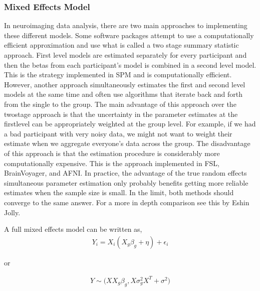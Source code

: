 \documentclass[letterpaper,10pt,english]{sphinxmanual}
\begin{document}
\subsubsection{Mixed Effects Model}
\label{\detokenize{content/Group_Analysis:mixed-effects-model}}
In neuroimaging data analysis, there are two main approaches to implementing these different models. Some software packages attempt to use a computationally efficient approximation and use what is called a two stage summary statistic approach. First level models are estimated separately for every participant and then the betas from each participant’s model is combined in a second level model. This is the strategy implemented in SPM and is computationally efficient. However, another approach simultaneously estimates the first and second level models at the same time and often use algorithms that iterate back and forth from the single to the group. The main advantage of this approach over the two\sphinxhyphen{}stage approach is that the uncertainty in the parameter estimates at the first\sphinxhyphen{}level can be appropriately weighted at the group level. For example, if we had a bad participant with very noisy data, we might not want to weight their estimate when we aggregate everyone’s data across the group. The disadvantage of this approach is that the estimation procedure is considerably more computationally expensive. This is the approach implemented in FSL, BrainVoyager, and AFNI. In practice, the advantage of the true random effects simultaneous parameter estimation only probably benefits getting more reliable estimates when the sample size is small. In the limit, both methods should converge to the same answer. For a more in depth comparison see this  by Eshin Jolly.

A full mixed effects model can be written as,
\begin{equation*}
\begin{split}Y_i = X_i(X_g\beta_g + \eta) +\epsilon_i\end{split}
\end{equation*}
\begin{sphinxVerbatim}[commandchars=\\\{\}]
     or
\end{sphinxVerbatim}
\begin{equation*}
\begin{split}Y \sim \mathcal(XX_g\beta_g, X\sigma_g^2X^T + \sigma^2)\end{split}
\end{equation*}
\end{document}
